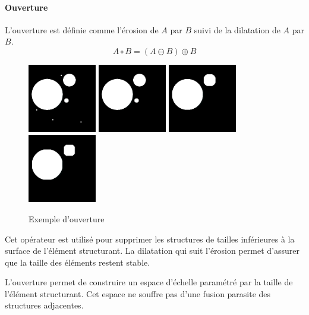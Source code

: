 {\paragraph{Ouverture}
L'ouverture est définie comme l'érosion de $A$ par $B$ suivi de la dilatation de $A$ par $B$.
\begin{equation}
 A \circ B = (A \ominus B) \oplus B
\end{equation}

\begin{figure}
  \centering
  \includegraphics[height=3cm]{Images/morpho_init.png}
  \includegraphics[height=3cm]{Images/morpho_open_k5.png}
  \includegraphics[height=3cm]{Images/morpho_open_k21.png}
  \includegraphics[height=3cm]{Images/morpho_open_k31.png}
  \label{fig:morpho_ouverture}
  \caption{Exemple d'ouverture}
\end{figure}

Cet opérateur est utilisé pour supprimer les structures de tailles inférieures à la surface de l'élément structurant. La dilatation qui suit l'érosion permet d'assurer que la taille des éléments restent stable.

L'ouverture permet de construire un espace d'échelle paramétré par la taille de l'élément structurant. Cet espace ne souffre pas d'une fusion parasite des structures adjacentes.

}
